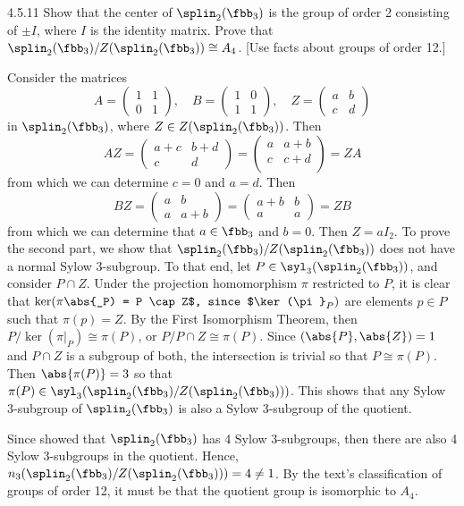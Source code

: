 \begin{exercise}{4.5.11}
	Show that the center of $\splin_2(\fbb_3)$ is the group of order 2 consisting of $\pm I$, where $I$ is the identity matrix.
	Prove that $\splin_2(\fbb_3)/Z(\splin_2(\fbb_3)) \cong A_4$. [Use facts about groups of order 12.]
\end{exercise}

\begin{sol}
	Consider the matrices
	\[
		A = 
		\begin{pmatrix}
			1 & 1 \\
			0 & 1
		\end{pmatrix}, \quad 
		B = 
		\begin{pmatrix}
			1 & 0 \\
			1 & 1
		\end{pmatrix}, \quad
		Z = 
		\begin{pmatrix}
			a & b \\
			c & d
		\end{pmatrix}
	\]
	in $\splin_2(\fbb_3)$, where $Z \in Z(\splin_2(\fbb_3))$.
	Then
	\[
		AZ = 
		\begin{pmatrix}
			a + c & b + d \\
			c & d
		\end{pmatrix} = 
		\begin{pmatrix}
			a & a + b \\
			c & c + d \\
		\end{pmatrix} = ZA
	\]
	from which we can determine $c = 0$ and $a = d$.
	Then
	\[
		BZ = 
		\begin{pmatrix}
			a & b \\
			a & a + b
		\end{pmatrix} = 
		\begin{pmatrix}
			a + b & b \\
			a & a
		\end{pmatrix} = ZB
	\]
	from which we can determine that $a \in \fbb_3$ and $b = 0$.
	Then $Z = aI_2$.
	To prove the second part, we show that $\splin_2(\fbb_3)/Z(\splin_2(\fbb_3))$ does not have a normal Sylow 3-subgroup.
	To that end, let $P \in \syl_3(\splin_2(\fbb_3))$, and consider $P \cap Z$.
	Under the projection homomorphism $\pi$ restricted to $P$, it is clear that $\ker(\pi\abs{_P) = P \cap Z$, since $\ker(\pi}_P)$ are elements $p \in P$ such that $\pi(p) = Z$.
	By the First Isomorphism Theorem, then $P/\ker(\pi|_P) \cong \pi(P)$, or $P/P \cap Z \cong \pi(P)$.
	Since $(\abs{P}, \abs{Z}) = 1$ and $P \cap Z$ is a subgroup of both, the intersection is trivial so that $P \cong \pi(P)$.
	Then $\abs{\pi(P)} = 3$ so that $\pi(P) \in \syl_3(\splin_2(\fbb_3)/Z(\splin_2(\fbb_3)))$.
	This shows that any Sylow 3-subgroup of $\splin_2(\fbb_3)$ is also a Sylow 3-subgroup of the quotient.

	Since  showed that $\splin_2(\fbb_3)$ has 4 Sylow 3-subgroups, then there are also 4 Sylow 3-subgroups in the quotient.
	Hence, $n_3(\splin_2(\fbb_3)/Z(\splin_2(\fbb_3))) = 4 \neq 1$.
	By the text's classification of groups of order 12, it must be that the quotient group is isomorphic to $A_4$.
\end{sol}

